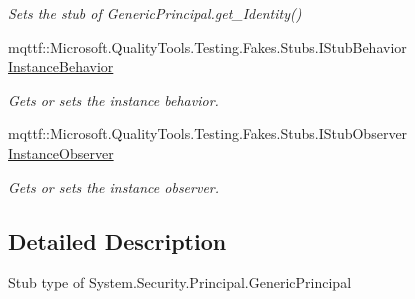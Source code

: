 \begin{DoxyCompactItemize}
\begin{DoxyCompactList}\small\item\em Sets the stub of Generic\-Principal.\-get\-\_\-\-Identity()\end{DoxyCompactList}\item 
mqttf\-::\-Microsoft.\-Quality\-Tools.\-Testing.\-Fakes.\-Stubs.\-I\-Stub\-Behavior \hyperlink{class_system_1_1_security_1_1_principal_1_1_fakes_1_1_stub_generic_principal_a396a79b378138c6ef8af3dbf3942015a}{Instance\-Behavior}
\begin{DoxyCompactList}\small\item\em Gets or sets the instance behavior.\end{DoxyCompactList}\item 
mqttf\-::\-Microsoft.\-Quality\-Tools.\-Testing.\-Fakes.\-Stubs.\-I\-Stub\-Observer \hyperlink{class_system_1_1_security_1_1_principal_1_1_fakes_1_1_stub_generic_principal_af8093da182582fa96f8f7303c45aa797}{Instance\-Observer}
\begin{DoxyCompactList}\small\item\em Gets or sets the instance observer.\end{DoxyCompactList}\end{DoxyCompactItemize}


\subsection{Detailed Description}
Stub type of System.\-Security.\-Principal.\-Generic\-Principal




